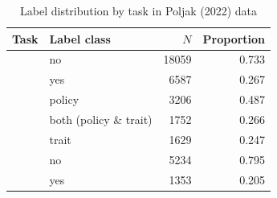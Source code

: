 \begin{table}[!t]

\caption{\label{tab:label_distribution_poljak_2022}Label distribution by task in Poljak (2022) data}
\centering
\fontsize{10}{12}\selectfont
\begin{tabular}[t]{>{\raggedright\arraybackslash}L{2.2in}lrr}
\toprule
\headrow Task & Label class & $N$ & Proportion\\
\midrule
 & no & 18059 & 0.733\\

 & yes & 6587 & 0.267\\
 & policy & 3206 & 0.487\\

 & both (policy \& trait) & 1752 & 0.266\\

 & trait & 1629 & 0.247\\
 & no & 5234 & 0.795\\

 & yes & 1353 & 0.205\\
\bottomrule
\end{tabular}
\end{table}
